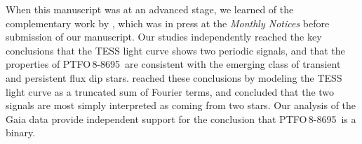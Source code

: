 \documentclass[12pt,twocolumn,tighten]{aastex62}
\newcommand{\ptfo}{PTFO$\,$8-8695}
\begin{document}

\acknowledgements
When this manuscript was at an advanced stage, we learned of the
complementary work by \citet{koen_2020}, which was in press at the
{\it Monthly Notices} before submission of our manuscript.  Our
studies independently reached the key conclusions that the TESS
light curve shows two periodic signals, and that the properties of
\ptfo\ are consistent with the emerging class of transient and
persistent flux dip stars.  \citet{koen_2020} reached these
conclusions by modeling the TESS light curve as a truncated sum of
Fourier terms, and concluded that the two signals are most simply
interpreted as coming from two stars.  Our analysis of the Gaia data
provide independent support for the conclusion that \ptfo\ is a
binary.
\end{document}
